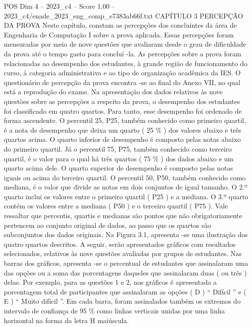 \begin{textsample}{POS Dim 4 – 2023\_c4 – Score 1.00 – 2023\_c4/enade\_2023\_eng\_comp\_e7383ab66f.txt}  \label{ex:f4_pos_177}
CAPÍTULO 3 PERCEPÇÃO DA PROVA Neste capítulo, constam as percepções dos concluintes da área de Engenharia de Computação I sobre a prova aplicada.
Essas percepções foram mensuradas por meio de nove questões que avaliaram desde o grau de dificuldade da prova até o tempo gasto para concluí -la.
As percepções sobre a prova foram relacionadas ao desempenho dos estudantes, à grande região de funcionamento do curso, à categoria administrativa e ao tipo de organização acadêmica da IES.
O questionário de percepção da prova encontra -se ao final do Anexo VII, no qual está a reprodução do exame.
Na apresentação dos dados relativos às nove questões sobre as percepções a respeito da prova, o desempenho dos estudantes foi classificado em quatro quartos.
Para tanto, esse desempenho foi ordenado de forma ascendente.
O percentil 25, P25, também conhecido como primeiro quartil, é a nota de desempenho que deixa um quarto ( 25 \% ) dos valores abaixo e três quartos acima.
O quarto inferior de desempenho é composto pelas notas abaixo do primeiro quartil.
Já o percentil 75, P75, também conhecido como terceiro quartil, é o valor para o qual há três quartos ( 75 \% ) dos dados abaixo e um quarto acima dele.
O quarto superior de desempenho é composto pelas notas iguais ou acima do terceiro quartil.
O percentil 50, P50, também conhecido como mediana, é o valor que divide as notas em dois conjuntos de igual tamanho.
O 2.º quarto inclui os valores entre o primeiro quartil ( P25 ) e a mediana.
O 3.º quarto contém os valores entre a mediana ( P50 ) e o terceiro quartil ( P75 ).
Vale ressaltar que percentis, quartis e medianas são pontos que não obrigatoriamente pertencem ao conjunto original de dados, ao passo que os quartos são subconjuntos dos dados originais.
Na Figura 3.1, apresenta -se uma ilustração dos quatro quartos descritos.
A seguir, serão apresentados gráficos com resultados selecionados, relativos às nove questões avaliadas por grupos de estudantes.
Nas barras dos gráficos, apresenta -se o percentual de estudantes que assinalaram uma das opções ou a soma das porcentagens daqueles que assinalaram duas ( ou três ) delas.
Por exemplo, para as questões 1 e 2, nos gráficos é apresentada a porcentagem total de participantes que assinalaram as opções ( D ) “ Difícil ” e ( E ) “ Muito difícil ”.
Em cada barra, foram assinalados também os extremos do intervalo de confiança de 95 \% como linhas verticais unidas por uma linha horizontal na forma da letra H maiúscula.

\end{textsample}
